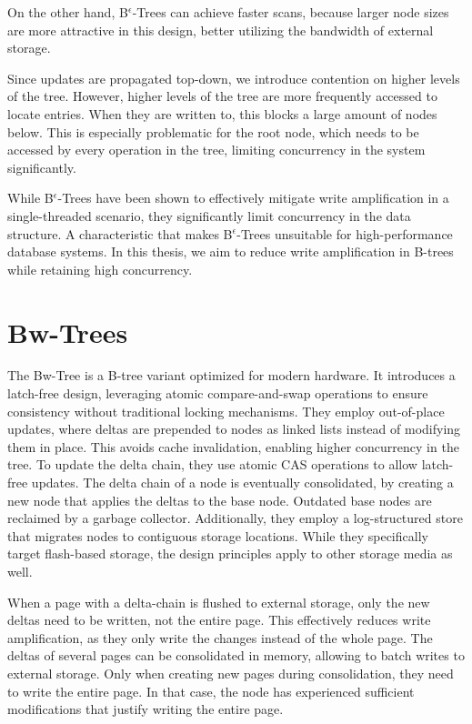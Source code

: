 On the other hand, B$^\epsilon$-Trees can achieve faster scans, because larger node sizes are more attractive in this design, better utilizing the bandwidth of external storage.

Since updates are propagated top-down, we introduce contention on higher levels of the tree.
However, higher levels of the tree are more frequently accessed to locate entries.
When they are written to, this blocks a large amount of nodes below.
This is especially problematic for the root node, which needs to be accessed by every operation in the tree, limiting concurrency in the system significantly.

While B$^\epsilon$-Trees have been shown to effectively mitigate write amplification in a single-threaded scenario, they significantly limit concurrency in the data structure.
A characteristic that makes B$^\epsilon$-Trees unsuitable for high-performance database systems.
In this thesis, we aim to reduce write amplification in B-trees while retaining high concurrency.


\section{Bw-Trees}
The Bw-Tree \cite{levandoski2013bw} is a B-tree variant optimized for modern hardware.
It introduces a latch-free design, leveraging atomic compare-and-swap operations to ensure consistency without traditional locking mechanisms.
They employ out-of-place updates, where deltas are prepended to nodes as linked lists instead of modifying them in place.
This avoids cache invalidation, enabling higher concurrency in the tree.
To update the delta chain, they use atomic \ac{CAS} operations to allow latch-free updates.
The delta chain of a node is eventually consolidated, by creating a new node that applies the deltas to the base node.
Outdated base nodes are reclaimed by a garbage collector.
Additionally, they employ a log-structured store that migrates nodes to contiguous storage locations.
While they specifically target flash-based storage, the design principles apply to other storage media as well.

When a page with a delta-chain is flushed to external storage, only the new deltas need to be written, not the entire page.
This effectively reduces write amplification, as they only write the changes instead of the whole page.
The deltas of several pages can be consolidated in memory, allowing to batch writes to external storage.
Only when creating new pages during consolidation, they need to write the entire page.
In that case, the node has experienced sufficient modifications that justify writing the entire page.

